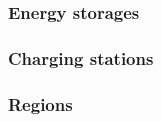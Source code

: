 \subsubsection{Energy storages}
\label{transitions_storages}


\subsubsection{Charging stations}
\label{transitions_stations}


\subsubsection{Regions}
\label{transitions_regions}

